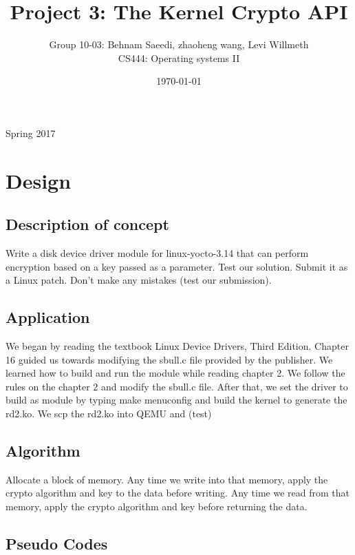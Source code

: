 \documentclass[journal,10pt,onecolumn,compsoc,letterpaper,draftclsnofoot,table,xcdraw]{IEEEtran} \usepackage[margin=0.75in]{geometry}
\title{Project 3: The Kernel Crypto API}
\author{Group 10-03: Behnam Saeedi, zhaoheng wang, Levi Willmeth\\ CS444: Operating systems II}
\date{\today}
\begin{document}
\maketitle
\begin{centering}
Spring 2017
\begin{abstract}
\noindent 
\end{abstract}
\end{centering}
\newpage
\tableofcontents
\newpage 
\section{Design}
\subsection{Description of concept}

\noindent Write a disk device driver module for linux-yocto-3.14 that can perform encryption based on a key passed as a parameter.  Test our solution.  Submit it as a Linux patch. Don't make any mistakes (test our submission).

\subsection{Application}

\noindent We began by reading the textbook Linux Device Drivers, Third Edition. Chapter 16 guided us towards modifying the sbull.c file provided by the publisher.  We learned how to build and run the module while reading chapter 2. We follow the rules on the chapter 2 and modify the sbull.c file. After that, we set the driver to build as module by typing make menuconfig and build the kernel to generate the rd2.ko. We scp the rd2.ko into QEMU and (test)

\subsection{Algorithm}

\noindent Allocate a block of memory. Any time we write into that memory, apply the crypto algorithm and key to the data before writing.  Any time we read from that memory, apply the crypto algorithm and key before returning the data.

\subsection{Pseudo Codes}
\end{document}
